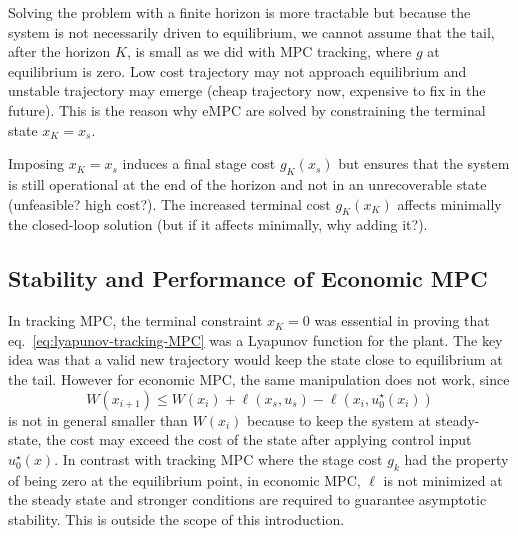 \documentclass[11pt]{report}
\begin{document}
Solving the problem with a finite horizon is more tractable but because the system is not necessarily driven to equilibrium, we cannot assume that the tail, after the horizon $K$, is small as we did with MPC tracking, where $g$ at equilibrium is zero. Low cost trajectory may not approach equilibrium and unstable trajectory may emerge (cheap trajectory now, expensive to fix in the future). This is the reason why eMPC are solved by constraining the terminal state $x_K=x_s$.

Imposing $x_K=x_s$ induces a final stage cost $g_K(x_s)$ but ensures that the system is still operational at the end of the horizon and not in an unrecoverable state (unfeasible? high cost?). The increased terminal cost $g_K(x_K)$ affects minimally the closed-loop solution (but if it affects minimally, why adding it?).

\subsection{Stability and Performance of Economic MPC}
\label{sec:stability-performance-economic-MPC}

In tracking MPC, the terminal constraint $x_K=0$ was essential in proving that eq.~\eqref{eq:lyapunov-tracking-MPC} was a Lyapunov function for the plant. The key idea was that a valid new trajectory would keep the state close to equilibrium at the tail. However for economic MPC, the same manipulation does not work, since
\begin{equation}
  \label{eq:eMPC-Lyapunov-like-inequality}
  W(x_{i+1}) \le W(x_i) + \ell(x_s,u_s) - \ell(x_i,u_0^\star(x_i))
\end{equation}
is not in general smaller than $W(x_i)$ because to keep the system at steady-state, the cost may exceed the cost of the state after applying control input $u_0^\star(x)$. In contrast with tracking MPC where the stage cost $g_k$ had the property of being zero at the equilibrium point, in economic MPC, $\ell$ is not minimized at the steady state and stronger conditions are required to guarantee asymptotic stability. This is outside the scope of this introduction.
\end{document}
